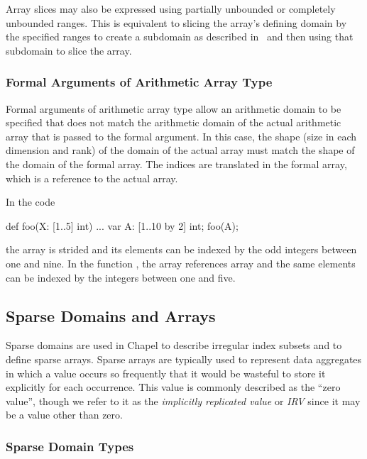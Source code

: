 Array slices may also be expressed using partially unbounded or
completely unbounded ranges.  This is equivalent to slicing the
array's defining domain by the specified ranges to create a subdomain
as described in~ and then using that
subdomain to slice the array.

\subsubsection{Formal Arguments of Arithmetic Array Type}
\label{Formal_Arguments_of_Arithmetic_Array_Type}

Formal arguments of arithmetic array type allow an arithmetic domain
to be specified that does not match the arithmetic domain of the
actual arithmetic array that is passed to the formal argument.  In
this case, the shape (size in each dimension and rank) of the domain
of the actual array must match the shape of the domain of the formal
array.  The indices are translated in the formal array, which is a
reference to the actual array.

\begin{example}
In the code
\begin{chapel}
def foo(X: [1..5] int) { ... }
var A: [1..10 by 2] int;
foo(A);
\end{chapel}
the array  is strided and its elements can be indexed by the
odd integers between one and nine.  In the function , the
array  references array  and the same elements can be
indexed by the integers between one and five.
\end{example}

\subsection{Sparse Domains and Arrays}
\label{Sparse_Domains_and_Arrays}

Sparse domains are used in Chapel to describe irregular index subsets
and to define sparse arrays.  Sparse arrays are typically used to
represent data aggregates in which a value occurs so frequently that
it would be wasteful to store it explicitly for each occurrence.  This
value is commonly described as the ``zero value'', though we refer to
it as the \emph{implicitly replicated value} or \emph{IRV} since it
may be a value other than zero.

\subsubsection{Sparse Domain Types}


